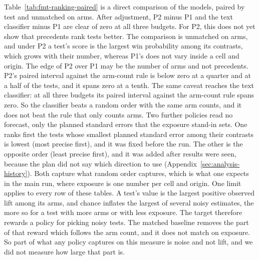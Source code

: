 Table~\ref{tab:fmt-ranking-paired} is a direct comparison of the models, paired by test and unmatched on arms. After adjustment, P2 minus P1 and the text classifier minus P1 are clear of zero at all three budgets. For P2, this does not yet show that precedents rank tests better. The comparison is unmatched on arms, and under P2 a test's score is the largest win probability among its contrasts, which grows with their number, whereas P1's does not vary inside a cell and origin.
The edge of P2 over P1 may be the number of arms and not precedents. P2's paired interval against the arm-count rule is below zero at a quarter and at a half of the tests, and it spans zero at a tenth. The same caveat reaches the text classifier: at all three budgets its paired interval against the arm-count rule spans zero. So the classifier beats a random order with the same arm counts, and it does not beat the rule that only counts arms. Two further policies read no forecast, only the planned standard errors that the exposure stand-in sets. One ranks first the tests whose smallest planned standard error among their contrasts is lowest (most precise first), and it was fixed before the run. The other is the opposite order (least precise first), and it was added after results were seen, because the plan did not say which direction to use (Appendix~\ref{sec:analysis-history}). Both capture what random order captures, which is what one expects in the main run, where exposure is one number per cell and origin. One limit applies to every row of these tables. A test's value is the largest positive observed lift among its arms, and chance inflates the largest of several noisy estimates, the more so for a test with more arms or with less exposure. The target therefore rewards a policy for picking noisy tests. The matched baseline removes the part of that reward which follows the arm count, and it does not match on exposure. So part of what any policy captures on this measure is noise and not lift, and we did not measure how large that part is.

